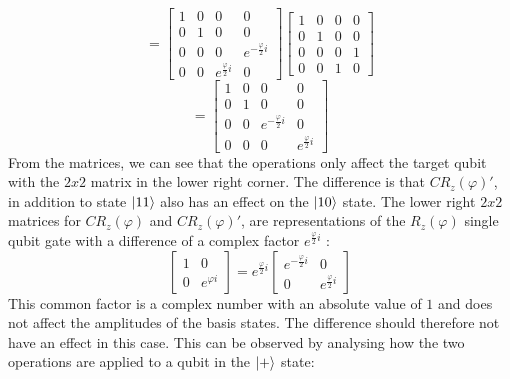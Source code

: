 \documentclass[12pt,a4paper]{article}
\begin{document}
    \[
    = 
    \begin{bmatrix}
        1 & 0 & 0 & 0 \\
        0 & 1 & 0 & 0 \\
        0 & 0 & 0 & e^{-\frac{\varphi}{2} i} \\
        0 & 0 & e^{\frac{\varphi}{2} i} & 0
    \end{bmatrix}
    \begin{bmatrix}
        1 & 0 & 0 & 0 \\
        0 & 1 & 0 & 0 \\
        0 & 0 & 0 & 1 \\
        0 & 0 & 1 & 0
    \end{bmatrix} 
    \]
    \[
    = 
    \begin{bmatrix}
        1 & 0 & 0 & 0 \\
        0 & 1 & 0 & 0 \\
        0 & 0 & e^{-\frac{\varphi}{2} i}  & 0\\
        0 & 0 & 0 & e^{\frac{\varphi}{2} i}
    \end{bmatrix}
\]
From the matrices, we can see that the operations only affect the target qubit with the \(2x2\) matrix in the lower right corner. The difference is that \(CR_z(\varphi)'\), in addition to state \(\ket{11}\) also has an effect on the \(\ket{10}\) state. The lower right \(2x2\) matrices for \(CR_z(\varphi)\) and \(CR_z(\varphi)'\), are representations of the \(R_z(\varphi)\) single qubit gate with a difference of a complex factor \(e^{\frac{\varphi}{2}i}\) \cite[p. 261]{sutor_dancing_2019}:
\[
\begin{bmatrix}
1 & 0 \\
0 & e^{\varphi i}
\end{bmatrix} 
= e^{\frac{\varphi}{2}i}
\begin{bmatrix}
e^{-\frac{\varphi}{2}i} & 0 \\
0 & e^{\frac{\varphi}{2}i}
\end{bmatrix} 
\]
This common factor is a complex number with an absolute value of \(1\) and does not affect the amplitudes of the basis states. The difference should therefore not have an effect in this case. This can be observed by analysing how the two operations are applied to a qubit in the \(\ket{+}\) state:
\end{document}
